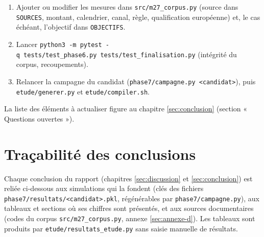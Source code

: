 \documentclass[
  11pt,
  11pt,
  a4paper,
  openany]{book}
\providecommand{\tightlist}{%
  \setlength{\itemsep}{0pt}\setlength{\parskip}{0pt}}
\begin{document}
\begin{enumerate}
\def\labelenumi{\arabic{enumi}.}
\tightlist
\item
  Ajouter ou modifier les mesures dans \texttt{src/m27\_corpus.py}
  (source dans \texttt{SOURCES}, montant, calendrier, canal, règle,
  qualification européenne) et, le cas échéant, l'objectif dans
  \texttt{OBJECTIFS}.
\item
  Lancer
  \texttt{python3\ -m\ pytest\ -q\ tests/test\_phase6.py\ tests/test\_finalisation.py}
  (intégrité du corpus, recoupements).
\item
  Relancer la campagne du candidat
  (\texttt{phase7/campagne.py\ \textless{}candidat\textgreater{}}), puis
  \texttt{etude/generer.py} et \texttt{etude/compiler.sh}.
\end{enumerate}

La liste des éléments à actualiser figure au chapitre
\ref{sec:conclusion} (section « Questions ouvertes »).

\hypertarget{sec:annexe-k}{%
\chapter{Traçabilité des conclusions}\label{sec:annexe-k}}

Chaque conclusion du rapport (chapitres \ref{sec:discussion} et
\ref{sec:conclusion}) est reliée ci-dessous aux simulations qui la
fondent (clés des fichiers
\texttt{phase7/resultats/\textless{}candidat\textgreater{}.pkl},
régénérables par \texttt{phase7/campagne.py}), aux tableaux et sections
où ses chiffres sont présentés, et aux sources documentaires (codes du
corpus \texttt{src/m27\_corpus.py}, annexe \ref{sec:annexe-d}). Les
tableaux sont produits par \texttt{etude/resultats\_etude.py} sans
saisie manuelle de résultats.
\end{document}
